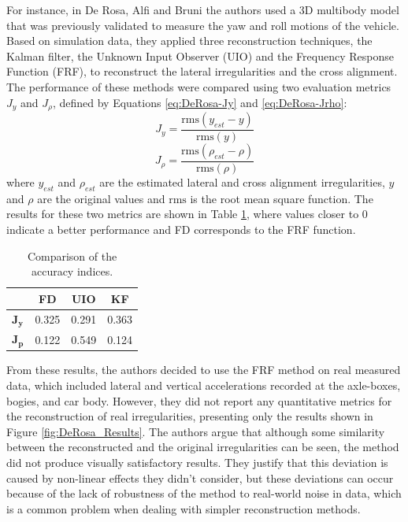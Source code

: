 For instance, in De Rosa, Alfi and Bruni \cite{DEROSA2019606} the authors used a 3D multibody model that was previously validated to measure the yaw and roll motions of the vehicle. Based on simulation data, they applied three reconstruction techniques, the Kalman filter, the Unknown Input Observer (UIO) and the Frequency Response Function (FRF), to reconstruct the lateral irregularities and the cross alignment. The performance of these methods were compared using two evaluation metrics $J_y$ and $J_\rho$, defined by Equations \ref{eq:DeRosa-Jy} and \ref{eq:DeRosa-Jrho}: 
\begin{equation}
    J_y = \frac{\text{rms}(y_{est} - y)}{\text{rms}(y)}
    \label{eq:DeRosa-Jy}
\end{equation} 
\begin{equation}
    J_\rho = \frac{\text{rms}(\rho_{est} - \rho)}{\text{rms}(\rho)}
    \label{eq:DeRosa-Jrho}
\end{equation}
where $y_{est}$ and $\rho_{est}$ are the estimated lateral and cross alignment irregularities, $y$ and $\rho$ are the original values and $\text{rms}$ is the root mean square function. The results for these two metrics are shown in Table \ref{tab:DeRosa_Results}, where values closer to 0 indicate a better performance and FD corresponds to the FRF function. 

\begin{table}[H]
\centering
\begin{tabular}{lccc}
    \hline
    & FD & UIO & KF \\
    \hline
    $\mathbf{J_y}$ & 0.325 & 0.291 & 0.363 \\
    $\mathbf{J_p}$ & 0.122 & 0.549 & 0.124 \\
    \hline
\end{tabular}
\caption{Comparison of the accuracy indices.}
\label{tab:DeRosa_Results}
\end{table}

From these results, the authors decided to use the FRF method on real measured data, which included lateral and vertical accelerations recorded at the axle-boxes, bogies, and car body. However, they did not report any quantitative metrics for the reconstruction of real irregularities, presenting only the results shown in Figure \ref{fig:DeRosa_Results}. The authors argue that although some similarity between the reconstructed and the original irregularities can be seen, the method did not produce visually satisfactory results. They justify that this deviation is caused by non-linear effects they didn't consider, but these deviations can occur because of the lack of robustness of the method to real-world noise in data, which is a common problem when dealing with simpler reconstruction methods.

